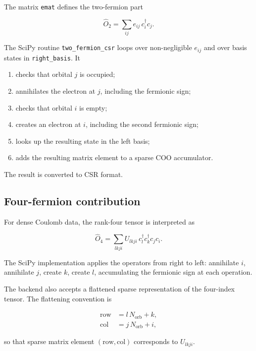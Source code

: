 \documentclass[11pt]{article}
\begin{document}
The matrix \texttt{emat} defines the two-fermion part

\begin{equation}
  \hat O_2 = \sum_{ij} e_{ij}\, c_i^\dagger c_j.
\end{equation}

The SciPy routine \texttt{two\_fermion\_csr} loops over non-negligible \(e_{ij}\) and over basis states in \texttt{right\_basis}.  It

\begin{enumerate}[label=\arabic*.]
  \item checks that orbital \(j\) is occupied;
  \item annihilates the electron at \(j\), including the fermionic sign;
  \item checks that orbital \(i\) is empty;
  \item creates an electron at \(i\), including the second fermionic sign;
  \item looks up the resulting state in the left basis;
  \item adds the resulting matrix element to a sparse COO accumulator.
\end{enumerate}

The result is converted to CSR format.

\subsection{Four-fermion contribution}

For dense Coulomb data, the rank-four tensor is interpreted as

\begin{equation}
  \hat O_4 = \sum_{lkji}
  U_{lkji}\,
  c_l^\dagger c_k^\dagger c_j c_i.
\end{equation}

The SciPy implementation applies the operators from right to left: annihilate \(i\), annihilate \(j\), create \(k\), create \(l\), accumulating the fermionic sign at each operation.

The backend also accepts a flattened sparse representation of the four-index tensor.  The flattening convention is

\begin{align}
  \mathrm{row} &= l\,N_{\mathrm{orb}} + k,\\
  \mathrm{col} &= j\,N_{\mathrm{orb}} + i,
\end{align}

so that sparse matrix element \((\mathrm{row},\mathrm{col})\) corresponds to \(U_{lkji}\).
\end{document}
